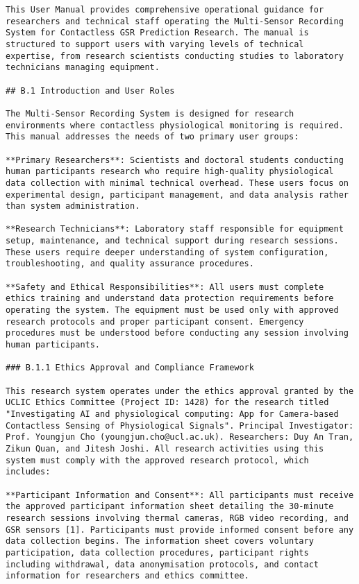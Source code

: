 \begin{verbatim}
This User Manual provides comprehensive operational guidance for researchers and technical staff operating the Multi-Sensor Recording System for Contactless GSR Prediction Research. The manual is structured to support users with varying levels of technical expertise, from research scientists conducting studies to laboratory technicians managing equipment.

## B.1 Introduction and User Roles

The Multi-Sensor Recording System is designed for research environments where contactless physiological monitoring is required. This manual addresses the needs of two primary user groups:

**Primary Researchers**: Scientists and doctoral students conducting human participants research who require high-quality physiological data collection with minimal technical overhead. These users focus on experimental design, participant management, and data analysis rather than system administration.

**Research Technicians**: Laboratory staff responsible for equipment setup, maintenance, and technical support during research sessions. These users require deeper understanding of system configuration, troubleshooting, and quality assurance procedures.

**Safety and Ethical Responsibilities**: All users must complete ethics training and understand data protection requirements before operating the system. The equipment must be used only with approved research protocols and proper participant consent. Emergency procedures must be understood before conducting any session involving human participants.

### B.1.1 Ethics Approval and Compliance Framework

This research system operates under the ethics approval granted by the UCLIC Ethics Committee (Project ID: 1428) for the research titled "Investigating AI and physiological computing: App for Camera-based Contactless Sensing of Physiological Signals". Principal Investigator: Prof. Youngjun Cho (youngjun.cho@ucl.ac.uk). Researchers: Duy An Tran, Zikun Quan, and Jitesh Joshi. All research activities using this system must comply with the approved research protocol, which includes:

**Participant Information and Consent**: All participants must receive the approved participant information sheet detailing the 30-minute research sessions involving thermal cameras, RGB video recording, and GSR sensors [1]. Participants must provide informed consent before any data collection begins. The information sheet covers voluntary participation, data collection procedures, participant rights including withdrawal, data anonymisation protocols, and contact information for researchers and ethics committee.


\end{verbatim}
